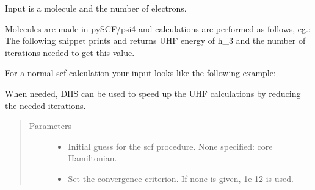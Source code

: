 \documentclass[letterpaper,10pt,english]{sphinxmanual}
\begin{document}
\begin{fulllineitems}
\label{\detokenize{cUHF_b:hf.cUHF_b.CUHF}}
Input is a molecule and the number of electrons.

Molecules are made in pySCF/psi4 and calculations are performed as follows, eg.:
The following snippet prints and returns UHF energy of h\_3
and the number of iterations needed to get this value.

For a normal scf calculation your input looks like the following example:

\begin{sphinxVerbatim}[commandchars=\\\{\}]
          
   
\end{sphinxVerbatim}

\begin{fulllineitems}
\label{\detokenize{cUHF_b:hf.cUHF_b.CUHF.diis}}
When needed, DIIS can be used to speed up the UHF calculations by reducing the needed iterations.
\begin{quote}\begin{description}
\item[{Parameters}] \leavevmode\begin{itemize}
\item {} 
 \textendash{} Initial guess for the scf procedure. None specified: core Hamiltonian.

\item {} 
 \textendash{} Set the convergence criterion. If none is given, 1e-12 is used.


\end{itemize}
\end{description}
\end{quote}
\end{fulllineitems}
\end{fulllineitems}
\end{document}
